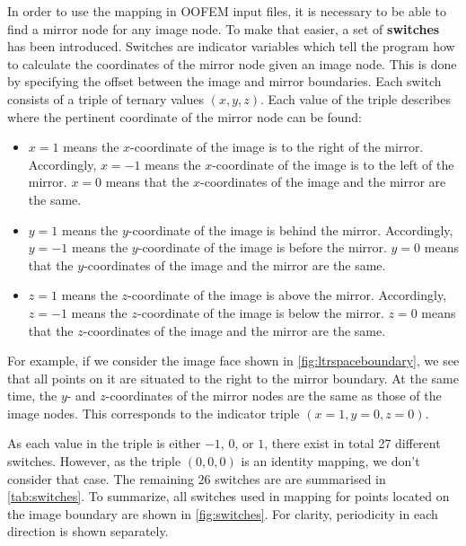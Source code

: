 \documentclass[11pt]{article}
\begin{document}
In order to use the mapping in OOFEM input files, it is necessary to be able to find a mirror node for any image node. To make that easier, a set of \textbf{switches} has been introduced. 
Switches are indicator variables which tell the program how to calculate the coordinates of the mirror node given an image node. This is done by specifying the offset between the image and mirror boundaries. 
Each switch consists of a triple of ternary values $(x,y,z)$.
Each value of the triple describes where the pertinent coordinate of the mirror node can be found:
\begin{itemize}
    \item $x=1$ means the $x$-coordinate of the image is to the right of the mirror. Accordingly, $x=-1$ means the $x$-coordinate of the image is to the left of the mirror. $x=0$ means that the $x$-coordinates of the image and the mirror are the same. 
    \item $y=1$ means the $y$-coordinate of the image is behind the mirror. Accordingly, $y=-1$ means the $y$-coordinate of the image is before the mirror. $y=0$ means that the $y$-coordinates of the image and the mirror are the same. 
    \item $z=1$ means the $z$-coordinate of the image is above the mirror. Accordingly, $z=-1$ means the $z$-coordinate of the image is below the mirror. $z=0$ means that the $z$-coordinates of the image and the mirror are the same.
\end{itemize}

For example, if we consider the image face shown in \cref{fig:ltrspaceboundary}, we see that all points on it are situated to the right to the mirror boundary. At the same time, the $y$- and $z$-coordinates of the mirror nodes are the same as those of the image nodes. This corresponds to the indicator triple $(x = 1, y=0, z = 0)$.

As each value in the triple is either $-1$, $0$, or $1$, there exist in total 27 different switches. 
However, as the triple $(0,0,0)$ is an identity mapping, we don't consider that case. The remaining $26$ switches are are summarised in \cref{tab:switches}. To summarize, all switches used in mapping for points located on the image boundary are shown in \cref{fig:switches}. For clarity, periodicity in each direction is shown separately.
\end{document}
